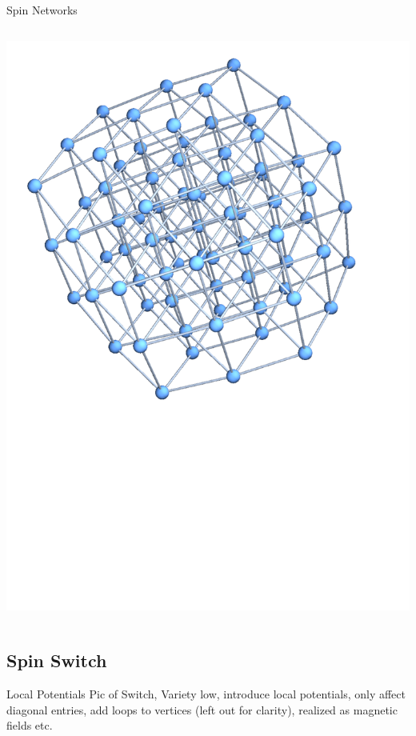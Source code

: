 \documentclass{beamer}
\begin{document}
\begin{frame}[t]{Spin Networks}
\begin{columns}[T]
\begin{column}{0.33\textwidth}
     		\includegraphics[trim=30mm 0 0 0, width=\textwidth]{Images/chain3_hypercube}
		\end{column}
	\end{columns}
\end{frame}

\subsection{Spin Switch}
\begin{frame}{Local Potentials}
    Pic of Switch, Variety low, introduce local potentials, only affect diagonal entries, add loops to vertices (left out for clarity), realized as magnetic fields etc.
\end{frame}
\end{document}
